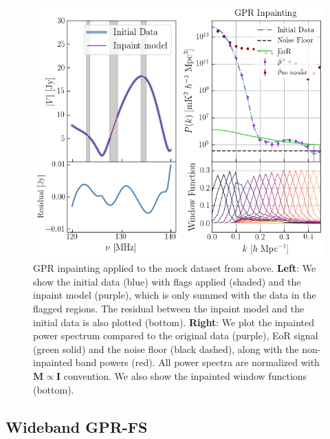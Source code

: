 \documentclass[a4paper,fleqn,usenatbib]{mnras}
\def\M{\boldsymbol{M}}
\def\I{\boldsymbol{I}}
\begin{document}
\begin{figure}
\centering
\includegraphics[scale=0.5]{imgs/gpr_low_noise_inpainting}
\caption{GPR inpainting applied to the mock dataset from above. {\bfseries Left}: We show the initial data (blue) with flags applied (shaded) and the inpaint model (purple), which is only summed with the data in the flagged regions. The residual between the inpaint model and the initial data is also plotted (bottom). {\bfseries Right}: We plot the inpainted power spectrum compared to the original data (purple), EoR signal (green solid) and the noise floor (black dashed), along with the non-inpainted band powers (red). All power spectra are normalized with $\M\propto\I$ convention. We also show the inpainted window functions (bottom). }
\label{fig:gpr_low_noise_inpainting}
\end{figure}


\subsection{Wideband GPR-FS}
\label{sec:wideband_gpr}
\end{document}
